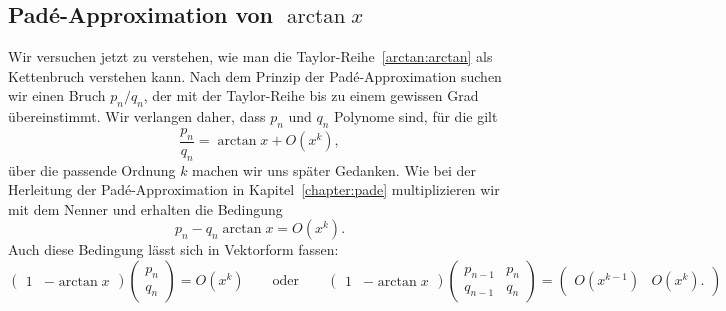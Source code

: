 \begin{refsection}
\section{Padé-Approximation von $\arctan x$
\label{arctan:section:kettenbruch}}
Wir versuchen jetzt zu verstehen, wie man die Taylor-Reihe~\ref{arctan:arctan}
als Kettenbruch verstehen kann.
Nach dem Prinzip der Padé-Approximation suchen wir einen Bruch $p_n/q_n$,
der mit der Taylor-Reihe bis zu einem gewissen Grad übereinstimmt.
Wir verlangen daher, dass $p_n$ und $q_n$ Polynome sind, für die gilt
\[
\frac{p_n}{q_n} = \arctan x + O(x^k),
\]
über die passende Ordnung $k$ machen wir uns später Gedanken.
Wie bei der Herleitung der Padé-Approximation in Kapitel~\ref{chapter:pade}
multiplizieren wir mit dem Nenner und erhalten die Bedingung
\begin{equation}
p_n - q_n\arctan x = O(x^k).
\label{arctan:bedingung}
\end{equation}
Auch diese Bedingung lässt sich in Vektorform fassen:
\begin{equation}
\begin{pmatrix}
1&-\arctan x
\end{pmatrix}
\begin{pmatrix} 
p_n\\q_n
\end{pmatrix}
=
O(x^k)
\qquad\text{oder}\qquad
\begin{pmatrix}
1&-\arctan x
\end{pmatrix}
\begin{pmatrix}
p_{n-1}&p_n\\
q_{n-1}&q_n
\end{pmatrix}
=
\begin{pmatrix}
O(x^{k-1})&O(x^k).
\end{pmatrix}
\label{arctan:bedingungmatrix}
\end{equation}


\end{refsection}
